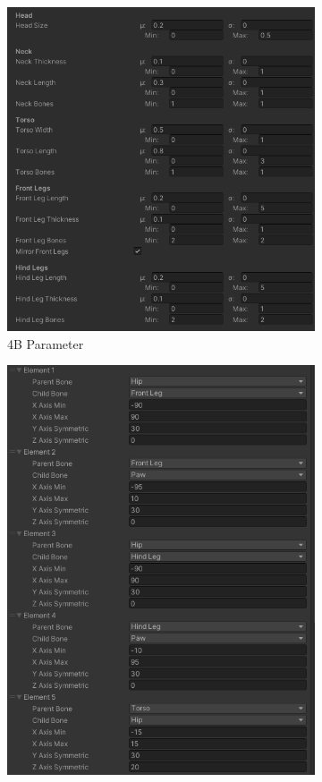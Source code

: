\begin{figure}
    \centering
    \begin{subfigure}[b]{0.45\textwidth}
        \centering
        \includegraphics[width=0.95\linewidth]{resources/img/4BSettings.png}
        \caption{4B Parameter}\label{fig:4B_creature_settings}
    \end{subfigure}
    \hfill
    \begin{subfigure}[b]{0.45\textwidth}
        \centering
        \includegraphics[width=0.95\linewidth]{resources/img/4BJointLimitOverrides.png}

\end{subfigure}
\end{figure}
